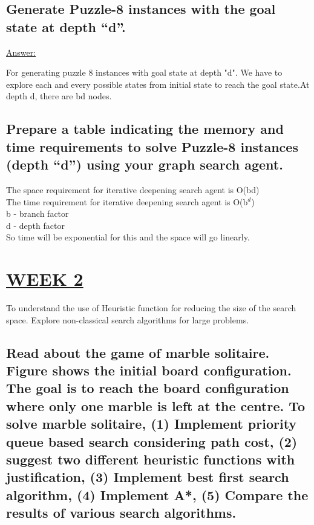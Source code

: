 \documentclass[15pt,journal]{IEEEtran}
\begin{document}
\subsection{Generate Puzzle-8 instances with the goal state at depth “d”.}

\underline{Answer:}

For generating puzzle 8 instances with goal state at depth "d". We have to explore each and every possible states from initial state to reach the goal state.At depth d, there are bd nodes.

\subsection{Prepare a table indicating the memory and time requirements to solve Puzzle-8 instances (depth “d”) using your graph search agent.}

The space requirement for iterative deepening search agent is O(bd)\\
The time requirement for iterative deepening search agent is O(b$^d$)\\
b - branch factor\\
d - depth factor\\
So time will be exponential for this and the space will go linearly.\\

\section{\large{\underline{WEEK 2}}}
 To understand the use of Heuristic function for reducing the size of the search space.  Explore non-classical search algorithms for large problems.
\subsection{Read about the game of marble solitaire. Figure shows the initial board configuration. The goal is to reach the board configuration where only one marble is left at the centre. To solve marble solitaire, (1) Implement priority queue based search considering path cost, (2) suggest two different heuristic functions with justification, (3) Implement best first search algorithm, (4) Implement A*, (5) Compare the results of various search algorithms. 
}
\end{document}
